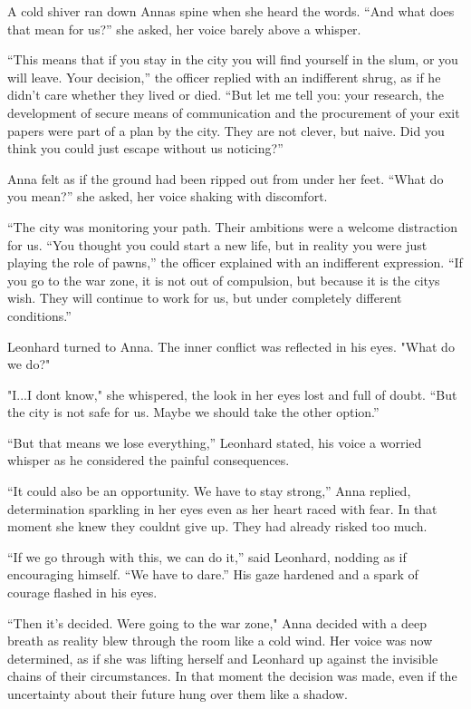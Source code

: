 \documentclass[
]{article}
\begin{document}
A cold shiver ran down Anna\textquotesingle s spine when she heard the
words. ``And what does that mean for us?'' she asked, her voice barely
above a whisper.

``This means that if you stay in the city you will find yourself in the
slum, or you will leave. Your decision,'' the officer replied with an
indifferent shrug, as if he didn't care whether they lived or died.
``But let me tell you: your research, the development of secure means of
communication and the procurement of your exit papers were part of a
plan by the city. They are not clever, but naive. Did you think you
could just escape without us noticing?''

Anna felt as if the ground had been ripped out from under her feet.
``What do you mean?'' she asked, her voice shaking with discomfort.

``The city was monitoring your path. Their ambitions were a welcome
distraction for us. ``You thought you could start a new life, but in
reality you were just playing the role of pawns,'' the officer explained
with an indifferent expression. ``If you go to the war zone, it is not
out of compulsion, but because it is the city\textquotesingle s wish.
They will continue to work for us, but under completely different
conditions.''

Leonhard turned to Anna. The inner conflict was reflected in his eyes.
"What do we do?"

"I...I don\textquotesingle t know," she whispered, the look in her eyes
lost and full of doubt. ``But the city is not safe for us. Maybe we
should take the other option.''

``But that means we lose everything,'' Leonhard stated, his voice a
worried whisper as he considered the painful consequences.

``It could also be an opportunity. We have to stay strong,'' Anna
replied, determination sparkling in her eyes even as her heart raced
with fear. In that moment she knew they couldn\textquotesingle t give
up. They had already risked too much.

``If we go through with this, we can do it,'' said Leonhard, nodding as
if encouraging himself. ``We have to dare.'' His gaze hardened and a
spark of courage flashed in his eyes.

``Then it's decided. We\textquotesingle re going to the war zone," Anna
decided with a deep breath as reality blew through the room like a cold
wind. Her voice was now determined, as if she was lifting herself and
Leonhard up against the invisible chains of their circumstances. In that
moment the decision was made, even if the uncertainty about their future
hung over them like a shadow.
\end{document}
